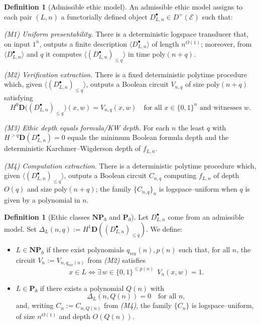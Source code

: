 \documentclass[12pt]{article}
\newcommand{\HD}[2]{H^{#1}\mathbf D(#2)} %
\newcommand{\E}{\mathcal{E}}
\newcommand{\Dplus}{D^{+}}
\theoremstyle{plain}
\theoremstyle{definition}
\newtheorem{definition}[theorem]{Definition}
\theoremstyle{remark}
\numberwithin{equation}{section}
\begin{document}
\begin{definition}[Admissible ethic model]
An admissible ethic model assigns to each pair \((L,n)\) a functorially defined object \(D_{L,n}^{\bullet}\in \Dplus(\E)\) such that:

\emph{(M1) Uniform presentability.} There is a deterministic logspace transducer that, on input \(1^{n}\), outputs a finite description \(\langle D_{L,n}^{\bullet}\rangle\) of length \(n^{O(1)}\); moreover, from \(\langle D_{L,n}^{\bullet}\rangle\) and \(q\) it computes \(\langle (D_{L,n}^{\bullet})_{\le q}\rangle\) in time poly\((n+q)\).

\emph{(M2) Verification extraction.} There is a fixed deterministic polytime procedure which, given \(\langle (D_{L,n}^{\bullet})_{\le q}\rangle\), outputs a Boolean circuit \(V_{n,q}\) of size poly\((n+q)\) satisfying
\[
H^{0}\mathbf D\!\big((D_{L,n}^{\bullet})_{\le q}\big)(x,w)=V_{n,q}(x,w)\quad
\text{for all }x\in\{0,1\}^{n}\text{ and witnesses }w.
\]

\emph{(M3) Ethic depth equals formula/KW depth.} For each \(n\) the least \(q\) with \(H^{>q}\mathbf D(D_{L,n}^{\bullet})=0\) equals the minimum Boolean formula depth and the deterministic Karchmer–Wigderson depth of \(f_{L,n}\).

\emph{(M4) Computation extraction.} There is a deterministic polytime procedure which, given \(\langle (D_{L,n}^{\bullet})_{\le q}\rangle\), outputs a Boolean circuit \(C_{n,q}\) computing \(f_{L,n}\) of depth \(O(q)\) and size poly\((n+q)\); the family \(\{C_{n,q}\}_{n}\) is logspace–uniform when \(q\) is given by a polynomial in \(n\).
\end{definition}

\begin{definition}[Ethic classes \(\mathbf{NP}_{\eth}\) and \(\mathbf P_{\eth}\)]
Let \(D_{L,n}^{\bullet}\) come from an admissible model.
Set \(\Delta_{L}(n,q):=\HD{1}{(D_{L,n}^{\bullet})_{\le q}}\).
We define:
\begin{itemize}[leftmargin=2em]
\item \(L\in \mathbf{NP}_{\eth}\) if there exist polynomials \(q_{\mathrm{ver}}(n),p(n)\) such that, for all \(n\), the circuit \(V_{n}:=V_{n,q_{\mathrm{ver}}(n)}\) from \emph{(M2)} satisfies
\[
x\in L \iff \exists\,w\in\{0,1\}^{\le p(n)}\ \ V_{n}(x,w)=1 .
\]
\item \(L\in \mathbf P_{\eth}\) if there exists a polynomial \(Q(n)\) with
\[
\Delta_{L}(n,Q(n))=0 \quad\text{for all }n,
\]
and, writing \(C_{n}:=C_{n,Q(n)}\) from \emph{(M4)}, the family \(\{C_{n}\}\) is logspace–uniform, of size \(n^{O(1)}\) and depth \(O(Q(n))\).
\end{itemize}
\end{definition}
\end{document}
